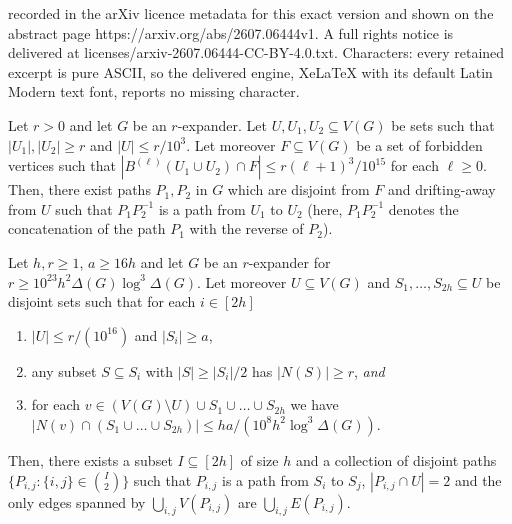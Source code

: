 \documentclass[10pt,a4paper]{amsart}
\begin{document}
recorded in the arXiv licence metadata for this exact version and shown on the abstract page https://arxiv.org/abs/2607.06444v1. A full rights notice is delivered at licenses/arxiv-2607.06444-CC-BY-4.0.txt. Characters: every retained excerpt is pure ASCII, so the delivered engine, XeLaTeX with its default Latin Modern text font, reports no missing character.
\begin{lemma}\label{lemma:drifting_away_paths}
    Let $r > 0$ and let $G$ be an $r$-expander.
    Let $U, U_1, U_2 \subseteq V(G)$ be sets such that $|U_1|, |U_2| \geq r$ and $|U| \leq r/10^3$.
    Let moreover $F \subseteq V(G)$ be a set of forbidden vertices such that $|B^{(\ell)}(U_1 \cup U_2) \cap F| \leq r(\ell+1)^3/10^{15}$ for each $\ell \geq 0$.
    Then, there exist paths $P_1, P_2$ in $G$ which are disjoint from $F$ and drifting-away from $U$ such that $P_1P_2^{-1}$ is a path from $U_1$ to $U_2$ (here, $P_1P_2^{-1}$ denotes the concatenation of the path $P_1$ with the reverse of $P_2$).
\end{lemma}

\begin{lemma}\label{lemma:collection_of_paths}
    Let $h, r \geq 1$, $a \geq 16h$ and let $G$ be an $r$-expander for $r \geq 10^{23}h^2\Delta(G)\log^3\Delta(G)$.
    Let moreover $U \subseteq V(G)$ and  $S_1, \dots, S_{2h} \subseteq U$ be disjoint sets such that for each $i \in [2h]$
    \begin{enumerate}
        \item $|U| \leq r/(10^{16})$ and $|S_i| \geq a$, 
        \item any subset $S \subseteq S_i$ with $|S| \geq |S_i| /2$ has $|N(S)| \geq r$, \emph{and}
        \item for each $v \in \left(V(G) \setminus U\right) \cup S_1 \cup \dots \cup S_{2h}$ we have $|N(v) \cap (S_1\cup \dots \cup S_{2h})| \leq ha/(10^{8}h^2\log^3\Delta(G))$.
    \end{enumerate}
    Then, there exists a subset $I \subseteq [2h]$ of size $h$ and a collection of disjoint paths $\{P_{i, j} : \{i, j\} \in \binom{I}{2}\}$ such that $P_{i, j}$ is a path from $S_i$ to $S_j$, $|P_{i, j} \cap U| =2$ and the only edges spanned by $\bigcup_{i, j} V(P_{i, j})$ are $\bigcup_{i, j} E(P_{i, j})$.
\end{lemma}
\end{document}
